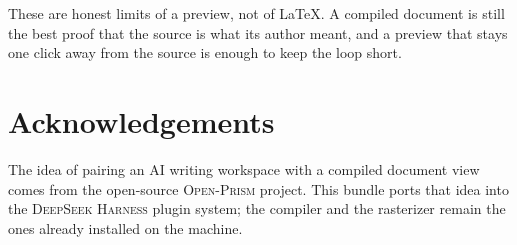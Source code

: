 \documentclass[11pt]{article}
\newcommand{\prism}{\textsc{Open-Prism}}
\newcommand{\dsh}{\textsc{DeepSeek Harness}}
\begin{document}
These are honest limits of a preview, not of \LaTeX{}. A compiled document is
still the best proof that the source is what its author meant, and a preview
that stays one click away from the source is enough to keep the loop short.

\section*{Acknowledgements}

The idea of pairing an AI writing workspace with a compiled document view comes
from the open-source \prism{} project. This bundle ports that idea into the
\dsh{} plugin system; the compiler and the rasterizer remain the ones already
installed on the machine.
\end{document}
